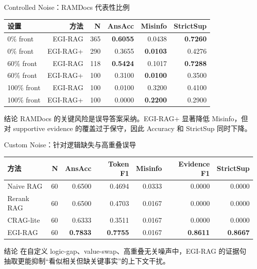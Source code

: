 \documentclass[aspectratio=169,10pt]{beamer}
\newcommand{\gain}[1]{\textcolor{MainGreen}{\textbf{#1}}}
\begin{document}
\begin{frame}{Controlled Noise：RAMDocs 代表性比例}
  \centering
  \small
  \begin{tabular}{lrrrrr}
    \toprule
    设置 & 方法 & N & AnsAcc & Misinfo & StrictSup \\
    \midrule
    0\% front & EGI-RAG & 365 & \gain{0.6055} & 0.0438 & \gain{0.7260} \\
    0\% front & EGI-RAG+ & 290 & 0.3655 & \gain{0.0103} & 0.4276 \\
    60\% front & EGI-RAG & 118 & \gain{0.5424} & 0.1017 & \gain{0.7288} \\
    60\% front & EGI-RAG+ & 100 & 0.3100 & \gain{0.0100} & 0.3500 \\
    100\% front & EGI-RAG & 100 & 0.0100 & 0.3200 & 0.4100 \\
    100\% front & EGI-RAG+ & 100 & 0.0000 & \gain{0.2200} & 0.2900 \\
    \bottomrule
  \end{tabular}
  \vspace{0.35cm}
  \begin{block}{结论}
    RAMDocs 的关键风险是误导答案采纳。EGI-RAG+ 显著降低 Misinfo，但对 supportive evidence 的覆盖过于保守，因此 Accuracy 和 StrictSup 同时下降。
  \end{block}
\end{frame}

\begin{frame}{Custom Noise：针对逻辑缺失与高重叠误导}
  \centering
  \small
  \begin{tabular}{lrrrrrr}
    \toprule
    方法 & N & AnsAcc & Token F1 & Misinfo & Evidence F1 & StrictSup \\
    \midrule
    Naive RAG & 60 & 0.6500 & 0.4694 & 0.0333 & 0.0000 & 0.0000 \\
    Rerank RAG & 60 & 0.6500 & 0.4703 & 0.0167 & 0.0000 & 0.0000 \\
    CRAG-lite & 60 & 0.6333 & 0.3511 & 0.0167 & 0.0000 & 0.0000 \\
    EGI-RAG & 60 & \gain{0.7833} & \gain{0.7755} & 0.0167 & \gain{0.8611} & \gain{0.8667} \\
    \bottomrule
  \end{tabular}
  \vspace{0.35cm}
  \begin{block}{结论}
    在自定义 logic-gap、value-swap、高重叠无关噪声中，EGI-RAG 的证据句抽取更能抑制“看似相关但缺关键事实”的上下文干扰。
  \end{block}
\end{frame}
\end{document}
